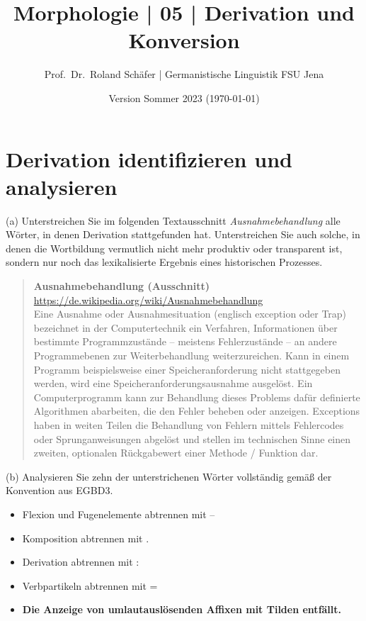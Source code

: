 \documentclass[12pt,a4paper,twoside]{article}
\author{Prof.\ Dr.\ Roland Schäfer | Germanistische Linguistik FSU Jena}
\title{Morphologie | 05 | Derivation und Konversion}
\date{Version Sommer 2023 (\today)}
\newcommand{\Zeile}{\vspace{\baselineskip}}
\newcommand{\Lf}{
  \setlength{\itemsep}{1pt}
  \setlength{\parskip}{0pt}
  \setlength{\parsep}{0pt}
}
\begin{document}
\maketitle

\section{Derivation identifizieren und analysieren}

(a) Unterstreichen Sie im folgenden Textausschnitt \textit{Ausnahmebehandlung} alle Wörter, in denen Derivation stattgefunden hat.
Unterstreichen Sie auch solche, in denen die Wortbildung vermutlich nicht mehr produktiv oder transparent ist, sondern nur noch das lexikalisierte Ergebnis eines historischen Prozesses.

 \begin{quote}\onehalfspacing
   \textbf{Ausnahmebehandlung (Ausschnitt)}\\
   {\footnotesize\url{https://de.wikipedia.org/wiki/Ausnahmebehandlung}}\\

   Eine Ausnahme oder Ausnahmesituation (englisch exception oder Trap) bezeichnet in der Computertechnik ein Verfahren, Informationen über bestimmte Programmzustände – meistens Fehlerzustände – an andere Programmebenen zur Weiterbehandlung weiterzureichen.
Kann in einem Programm beispielsweise einer Speicheranforderung nicht stattgegeben werden, wird eine Speicheranforderungsausnahme ausgelöst. Ein Computerprogramm kann zur Behandlung dieses Problems dafür definierte Algorithmen abarbeiten, die den Fehler beheben oder anzeigen.
Exceptions haben in weiten Teilen die Behandlung von Fehlern mittels Fehlercodes oder Sprunganweisungen abgelöst und stellen im technischen Sinne einen zweiten, optionalen Rückgabewert einer Methode / Funktion dar.
 \end{quote}

\Zeile

(b) Analysieren Sie zehn der unterstrichenen Wörter vollständig gemäß der Konvention aus EGBD3.

\begin{itemize}\Lf
  \item Flexion und Fugenelemente abtrennen mit --
  \item Komposition abtrennen mit .
  \item Derivation abtrennen mit :
  \item Verbpartikeln abtrennen mit =
  \item \textbf{Die Anzeige von umlautauslösenden Affixen mit Tilden entfällt.}
\end{itemize}
\end{document}
